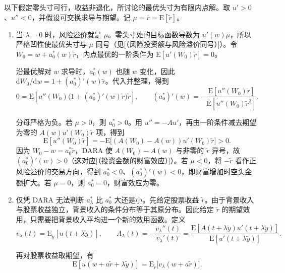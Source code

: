 \begin{solution}[blank-type=manual,blank-vsep=12\baselineskip]
以下假定零头寸可行，收益非退化，所讨论的最优头寸为有限内点解。取 $u'>0$、$u''<0$，并假设可交换求导与期望。记 $\mu=\bar r=\mathrm E[\tilde r]$。
\begin{enumerate}[label=(\alph*)]
\item 当 $\lambda=0$ 时，风险溢价就是 $\mu$。零头寸处的目标函数导数为 $u'(w)\mu$，所以严格凹性使最优头寸与 $\mu$ 同号\ifdefined\WJHandoutKnowledge（见[（风险投资额与风险溢价同号）]）\fi。令 $W_0=w+a_0^*(w)\tilde r$，内点最优的一阶条件为 $\mathrm E[u'(W_0)\tilde r]=0$。

沿最优解对 $w$ 求导时，$a_0^*(w)$ 也随 $w$ 变化，因此 $\mathrm dW_0/\mathrm dw=1+(a_0^*)'(w)\tilde r$。代入并整理，得到
\[
 0=\mathrm E\!\left[u''(W_0)\bigl(1+(a_0^*)'(w)\tilde r\bigr)\tilde r\right],
 \qquad
 (a_0^*)'(w)=-\frac{\mathrm E[u''(W_0)\tilde r]}
                         {\mathrm E[u''(W_0)\tilde r^2]}.
\]

分母严格为负。若 $\mu>0$，则 $a_0^*>0$。用 $u''=-Au'$，再由一阶条件减去期望为零的 $A(w)u'(W_0)\tilde r$ 项，得到
\[
 \mathrm E[u''(W_0)\tilde r]
 =-\mathrm E\bigl[(A(W_0)-A(w))u'(W_0)\tilde r\bigr]>0.
\]
因为 $W_0-w=a_0^*\tilde r$，DARA 使 $A(W_0)-A(w)$ 与非零的 $\tilde r$ 异号，故 $(a_0^*)'(w)>0$\ifdefined\WJHandoutKnowledge（这对应[（投资金额的财富效应）]）\fi。若 $\mu<0$，将 $-\tilde r$ 看作正风险溢价的交易方向，得到 $a_0^*<0$、$(a_0^*)'(w)<0$，即财富增加时空头金额扩大。若 $\mu=0$，则 $a_0^*=0$，财富效应为零。

\item 仅凭 DARA 无法判断 $a_\lambda^*$ 比 $a_0^*$ 大还是小。先给定股票收益 $\tilde r$。由于背景收入与股票收益独立，背景收入的条件分布等于其原分布。因此给定 $\tilde r$ 的期望效用，只需要把背景收入平均进一个新的效用函数。定义
\[
 v_\lambda(t)=\mathrm E_{\tilde y}[u(t+\lambda\tilde y)],\qquad
 A_\lambda(t)=-\frac{v_\lambda''(t)}{v_\lambda'(t)}
 =\frac{\mathrm E[A(t+\lambda\tilde y)u'(t+\lambda\tilde y)]}
        {\mathrm E[u'(t+\lambda\tilde y)]}.
\]

再对股票收益取期望，有
\[
 \mathrm E[u(w+a\tilde r+\lambda\tilde y)]
 =\mathrm E_{\tilde r}\bigl[v_\lambda(w+a\tilde r)\bigr].
\]


\end{enumerate}
\end{solution}
